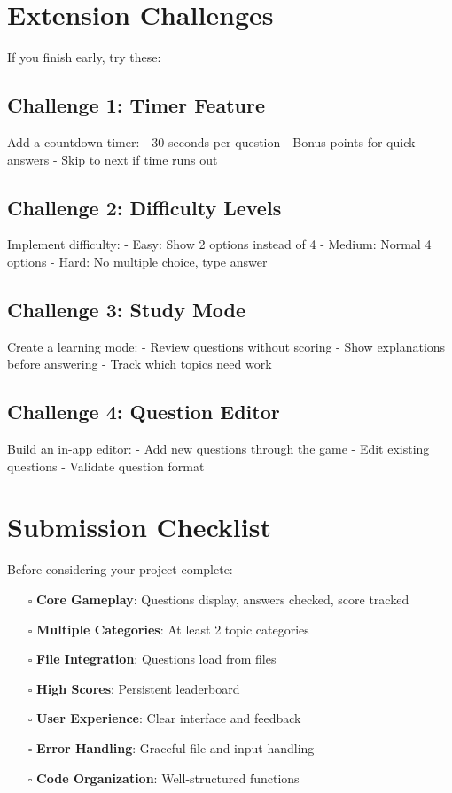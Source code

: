 \documentclass[
  letterpaper,
  DIV=11,
  numbers=noendperiod,
  oneside]{scrreprt}
\providecommand{\tightlist}{%
  \setlength{\itemsep}{0pt}\setlength{\parskip}{0pt}}\usepackage{longtable,booktabs,array}
\begin{document}
\section{Extension Challenges}\label{extension-challenges-7}

If you finish early, try these:

\subsection{Challenge 1: Timer Feature}\label{challenge-1-timer-feature}

Add a countdown timer: - 30 seconds per question - Bonus points for
quick answers - Skip to next if time runs out

\subsection{Challenge 2: Difficulty
Levels}\label{challenge-2-difficulty-levels}

Implement difficulty: - Easy: Show 2 options instead of 4 - Medium:
Normal 4 options - Hard: No multiple choice, type answer

\subsection{Challenge 3: Study Mode}\label{challenge-3-study-mode}

Create a learning mode: - Review questions without scoring - Show
explanations before answering - Track which topics need work

\subsection{Challenge 4: Question
Editor}\label{challenge-4-question-editor}

Build an in-app editor: - Add new questions through the game - Edit
existing questions - Validate question format

\section{Submission Checklist}\label{submission-checklist-7}

Before considering your project complete:

\begin{itemize}
\tightlist
\item[$\square$]
  \textbf{Core Gameplay}: Questions display, answers checked, score
  tracked
\item[$\square$]
  \textbf{Multiple Categories}: At least 2 topic categories
\item[$\square$]
  \textbf{File Integration}: Questions load from files
\item[$\square$]
  \textbf{High Scores}: Persistent leaderboard
\item[$\square$]
  \textbf{User Experience}: Clear interface and feedback
\item[$\square$]
  \textbf{Error Handling}: Graceful file and input handling
\item[$\square$]
  \textbf{Code Organization}: Well-structured functions
\end{itemize}
\end{document}

